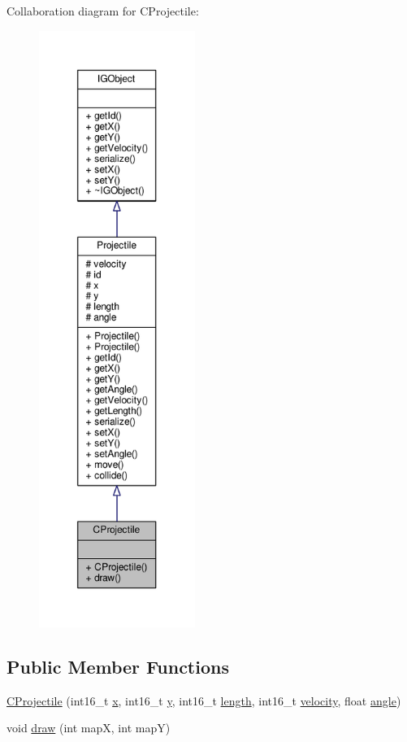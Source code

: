 Collaboration diagram for C\+Projectile\+:\nopagebreak
\begin{figure}[H]
\begin{center}
\leavevmode
\includegraphics[height=550pt]{class_c_projectile__coll__graph}
\end{center}
\end{figure}
\subsection*{Public Member Functions}
\begin{DoxyCompactItemize}
\item 
\hyperlink{class_c_projectile_af1fb343501445d3353584cb78545c7e0}{C\+Projectile} (int16\+\_\+t \hyperlink{class_projectile_a706363cbafcbe19aa68853b2821e63b5}{x}, int16\+\_\+t \hyperlink{class_projectile_a19d3eab0725a2679d39c6d316e3681ca}{y}, int16\+\_\+t \hyperlink{class_projectile_a123f18a0665fd6ae48dcbd900647defb}{length}, int16\+\_\+t \hyperlink{class_projectile_a0f40006b298e765555e5494f3bbdc929}{velocity}, float \hyperlink{class_projectile_a5c3f2c4e44bd0607dbdb55ebfb86f88b}{angle})
\item 
void \hyperlink{class_c_projectile_a164f1820536f396cc7118c0ab9bec69f}{draw} (int map\+X, int map\+Y)
\end{DoxyCompactItemize}
